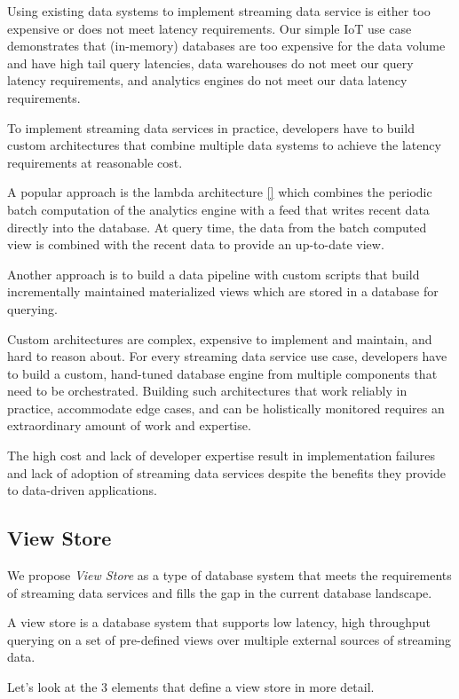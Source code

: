 \documentclass[	DIV=calc,%
							paper=letter,%
							fontsize=11pt,%
							twocolumn]{scrartcl}	 					%
\begin{document}
Using existing data systems to implement streaming data service is either too expensive or does not meet latency requirements. Our simple IoT use case demonstrates that (in-memory) databases are too expensive for the data volume and have high tail query latencies, data warehouses do not meet our query latency requirements, and analytics engines do not meet our data latency requirements.

To implement streaming data services in practice, developers have to build custom architectures that combine multiple data systems to achieve the latency requirements at reasonable cost.

A popular approach is the lambda architecture \ref{} which combines the periodic batch computation of the analytics engine with a feed that writes recent data directly into the database. At query time, the data from the batch computed view is combined with the recent data to provide an up-to-date view.

Another approach is to build a data pipeline with custom scripts that build incrementally maintained materialized views which are stored in a database for querying.

Custom architectures are complex, expensive to implement and maintain, and hard to reason about. For every streaming data service use case, developers have to build a custom, hand-tuned database engine from multiple components that need to be orchestrated. Building such architectures that work reliably in practice, accommodate edge cases, and can be holistically monitored requires an extraordinary amount of work and expertise.

The high cost and lack of developer expertise result in implementation failures and lack of adoption of streaming data services despite the benefits they provide to data-driven applications.

\subsection{View Store}
\label{sec:viewstoredef}

We propose \emph{View Store} as a type of database system that meets the requirements of streaming data services and fills the gap in the current database landscape.

A view store is a database system that supports low latency, high throughput querying on a set of pre-defined views over multiple external sources of streaming data.

Let's look at the 3 elements that define a view store in more detail.
\end{document}
